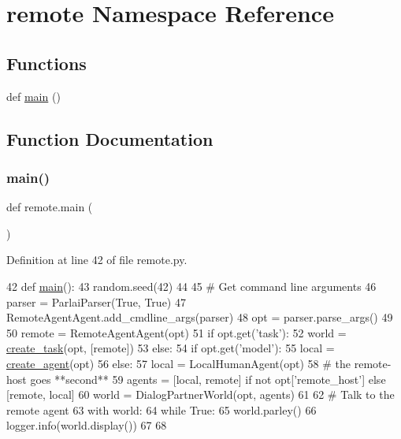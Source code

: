\hypertarget{namespaceremote}{}\section{remote Namespace Reference}
\label{namespaceremote}
\subsection*{Functions}
\begin{DoxyCompactItemize}
\item 
def \hyperlink{namespaceremote_aa8eb15effdae452b1fde3639cd9bc267}{main} ()
\end{DoxyCompactItemize}


\subsection{Function Documentation}
\mbox{\label{namespaceremote_aa8eb15effdae452b1fde3639cd9bc267}} 
\subsubsection{\texorpdfstring{main()}{main()}}
{\footnotesize\ttfamily def remote.\+main (\begin{DoxyParamCaption}{ }\end{DoxyParamCaption})}



Definition at line 42 of file remote.\+py.


\begin{DoxyCode}
42 \textcolor{keyword}{def }\hyperlink{namespaceremote_aa8eb15effdae452b1fde3639cd9bc267}{main}():
43     random.seed(42)
44 
45     \textcolor{comment}{# Get command line arguments}
46     parser = ParlaiParser(\textcolor{keyword}{True}, \textcolor{keyword}{True})
47     RemoteAgentAgent.add\_cmdline\_args(parser)
48     opt = parser.parse\_args()
49 
50     remote = RemoteAgentAgent(opt)
51     \textcolor{keywordflow}{if} opt.get(\textcolor{stringliteral}{'task'}):
52         world = \hyperlink{namespaceparlai_1_1core_1_1worlds_a11923c10b545c7ecc1b08fe2242d9c2c}{create\_task}(opt, [remote])
53     \textcolor{keywordflow}{else}:
54         \textcolor{keywordflow}{if} opt.get(\textcolor{stringliteral}{'model'}):
55             local = \hyperlink{namespaceparlai_1_1core_1_1agents_ad0d54074d4bcc148bb415ab5515a53b5}{create\_agent}(opt)
56         \textcolor{keywordflow}{else}:
57             local = LocalHumanAgent(opt)
58         \textcolor{comment}{# the remote-host goes **second**}
59         agents = [local, remote] \textcolor{keywordflow}{if} \textcolor{keywordflow}{not} opt[\textcolor{stringliteral}{'remote\_host'}] \textcolor{keywordflow}{else} [remote, local]
60         world = DialogPartnerWorld(opt, agents)
61 
62     \textcolor{comment}{# Talk to the remote agent}
63     with world:
64         \textcolor{keywordflow}{while} \textcolor{keyword}{True}:
65             world.parley()
66             logger.info(world.display())
67 
68 
\end{DoxyCode}
